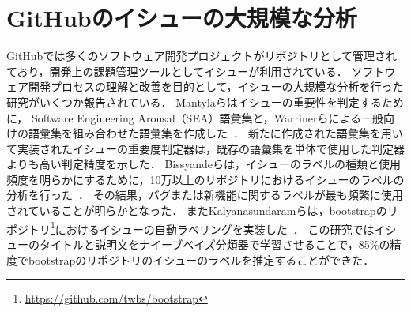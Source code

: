 






\section{GitHubのイシューの大規模な分析}

GitHubでは多くのソフトウェア開発プロジェクトがリポジトリとして管理されており，開発上の課題管理ツールとしてイシューが利用されている．
ソフトウェア開発プロセスの理解と改善を目的として，イシューの大規模な分析を行った研究がいくつか報告されている．
Mantylaらはイシューの重要性を判定するために， Software Engineering Arousal（SEA）語彙集と，Warrinerらによる一般向けの語彙集を組み合わせた語彙集を作成した~\cite{Mantyla:issue:word:list}．
新たに作成された語彙集を用いて実装されたイシューの重要度判定器は，既存の語彙集を単体で使用した判定器よりも高い判定精度を示した．
Bissyandeらは，イシューのラベルの種類と使用頻度を明らかにするために，10万以上のリポジトリにおけるイシューのラベルの分析を行った~\cite{Bissyande:gh:issues}．
その結果，バグまたは新機能に関するラベルが最も頻繁に使用されていることが明らかとなった．
またKalyanasundaramらは，bootstrapのリポジトリ\footnote{\url{https://github.com/twbs/bootstrap}}におけるイシューの自動ラベリングを実装した~\cite{kalyanasundaram2014automatic}．
この研究ではイシューのタイトルと説明文をナイーブベイズ分類器で学習させることで，85\%の精度でbootstrapのリポジトリのイシューのラベルを推定することができた．

